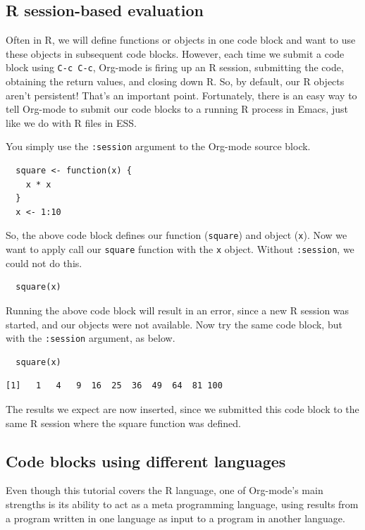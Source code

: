 \documentclass[11pt]{article}
\begin{document}
\subsection*{R session-based evaluation}
\label{sec-4-1}

Often in R, we will define functions or objects in one code block and
want to use these objects in subsequent code blocks. However, each
time we submit a code block using \texttt{C-c C-c}, Org-mode is firing up an
R session, submitting the code, obtaining the return values, and
closing down R. So, by default, our R objects aren't persistent!
That's an important point. Fortunately, there is an easy way to tell
Org-mode to submit our code blocks to a running R process in Emacs,
just like we do with R files in ESS.

You simply use the \texttt{:session} argument to the Org-mode source block.

\begin{verbatim}
  square <- function(x) {
    x * x
  }
  x <- 1:10
\end{verbatim}

So, the above code block defines our function (\texttt{square}) and object
(\texttt{x}). Now we want to apply call our \texttt{square} function with the \texttt{x}
object. Without \texttt{:session}, we could not do this.

\begin{verbatim}
  square(x)
\end{verbatim}

Running the above code block will result in an error, since a new R
session was started, and our objects were not available. Now try the
same code block, but with the \texttt{:session} argument, as below.

\begin{verbatim}
  square(x)
\end{verbatim}

\begin{verbatim}
[1]   1   4   9  16  25  36  49  64  81 100
\end{verbatim}

The results we expect are now inserted, since we submitted this code
block to the same R session where the square function was defined.
\subsection*{Code blocks using different languages}
\label{sec-4-2}

Even though this tutorial covers the R language, one of Org-mode's
main strengths is its ability to act as a meta programming language,
using results from a program written in one language as input to a
program in another language.
\end{document}
